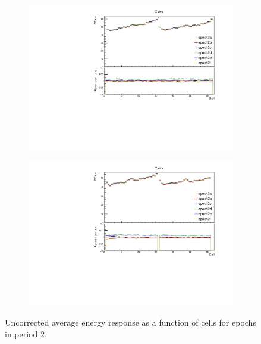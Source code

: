 \documentclass[12pt,a4paper]{article}
\begin{document}
\begin{figure}[h]
\centering
\begin{subfigure}[b]{0.495\textwidth}
\centering
\includegraphics[width=\textwidth]{Plots/Attenprofs_P2Data_CellPE_X_Combined.pdf}
\end{subfigure}
\begin{subfigure}[b]{0.495\textwidth}
\centering
\includegraphics[width=\textwidth]{Plots/Attenprofs_P2Data_CellPE_Y_Combined.pdf}
\end{subfigure}
\caption{Uncorrected average energy response as a function of cells for epochs in period 2.}
\label{figCalibhistCellPE_period2}
\end{figure}
\end{document}
